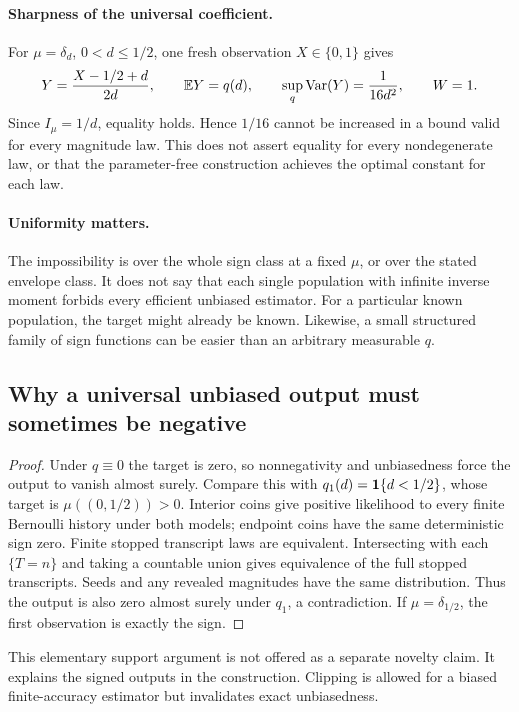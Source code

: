 \paragraph{Sharpness of the universal coefficient.}
For $\mu=\delta_d$, $0<d\le1/2$, one fresh observation $X\in\{0,1\}$ gives
\begin{equation}\label{eq:fixed-gap-sharp}
 Y=\frac{X-1/2+d}{2d},\qquad \mathbb E Y=q(d),\qquad
 \sup_q\operatorname{Var}(Y)=\frac1{16d^2},\qquad W=1.
\end{equation}
Since $I_\mu=1/d$, equality holds. Hence $1/16$ cannot be increased in a
bound valid for every magnitude law. This does not assert equality for
every nondegenerate law, or that the parameter-free construction achieves
the optimal constant for each law.

\paragraph{Uniformity matters.}
The impossibility is over the whole sign class at a fixed $\mu$, or over
the stated envelope class. It does not say that each single population
with infinite inverse moment forbids every efficient unbiased estimator.
For a particular known population, the target might already be known.
Likewise, a small structured family of sign functions can be easier than
an arbitrary measurable $q$.

\subsection{Why a universal unbiased output must sometimes be negative}
\label{sec:bounded}
\begin{proof}
Under $q\equiv0$ the target is zero, so nonnegativity and unbiasedness force
the output to vanish almost surely. Compare this with
$q_1(d)=\mathbf 1\{d<1/2\}$, whose target is $\mu((0,1/2))>0$.
Interior coins give positive likelihood to every finite Bernoulli history
under both models; endpoint coins have the same deterministic sign zero.
Finite stopped transcript laws are equivalent. Intersecting with each
$\{T=n\}$ and taking a countable union gives equivalence of the full stopped
transcripts. Seeds and any revealed magnitudes have the same distribution.
Thus the output is also zero almost surely under $q_1$, a contradiction.
If $\mu=\delta_{1/2}$, the first observation is exactly the sign.
\end{proof}
This elementary support argument is not offered as a separate novelty
claim. It explains the signed outputs in the construction. Clipping is
allowed for a biased finite-accuracy estimator but invalidates exact
unbiasedness.

